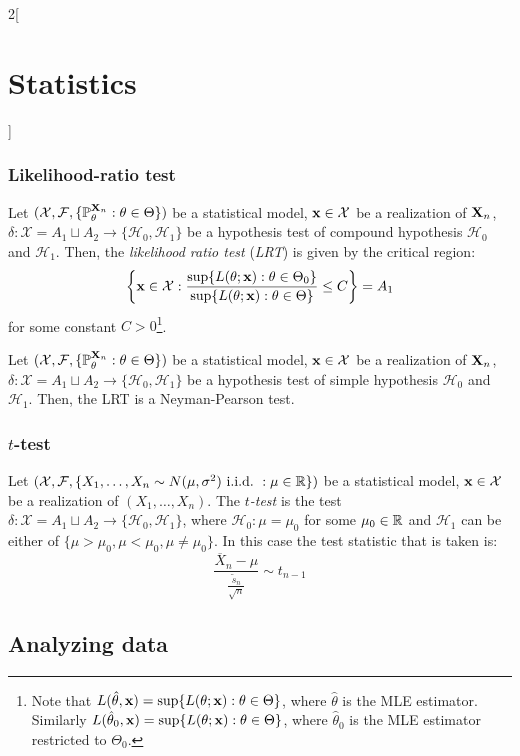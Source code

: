 \documentclass[../../../main.tex]{subfiles}
\begin{document}
\begin{multicols}{2}[\section{Statistics}]
  \subsubsection{Likelihood-ratio test}
  \begin{definition}
    Let $(\mathcal{X},\mathcal{F},\{\mathbb{P}_\theta^{\boldsymbol{\mathrm{X}}_n}:\theta\in\Theta\})$ be a statistical model, $\boldsymbol{\mathrm{x}}\in\mathcal{X}$ be a realization of $\boldsymbol{\mathrm{X}}_n$, $\delta:\mathcal{X}=A_1\sqcup A_2\rightarrow\{\mathcal{H}_0,\mathcal{H}_1\}$ be a hypothesis test of compound hypothesis $\mathcal{H}_0$ and $\mathcal{H}_1$.
    Then, the \emph{likelihood ratio test} (\emph{LRT}) is given by the critical region:
    $$\left\{\boldsymbol{\mathrm{x}}\in\mathcal{X}:\frac{\sup\{L(\theta;\boldsymbol{\mathrm{x}}):\theta\in\Theta_0\}}{\sup\{L(\theta;\boldsymbol{\mathrm{x}}):\theta\in\Theta\}}\leq C\right\}= A_1$$
    for some constant $C>0$\footnote{Note that $L(\hat\theta,\boldsymbol{\mathrm{x}})=\sup\{L(\theta;\boldsymbol{\mathrm{x}}):\theta\in\Theta\}$, where $\hat\theta$ is the MLE estimator. Similarly $L(\hat\theta_0,\boldsymbol{\mathrm{x}})=\sup\{L(\theta;\boldsymbol{\mathrm{x}}):\theta\in\Theta\}$, where $\hat\theta_0$ is the MLE estimator restricted to $\Theta_0$.}.
  \end{definition}
  \begin{proposition}
    Let $(\mathcal{X},\mathcal{F},\{\mathbb{P}_\theta^{\boldsymbol{\mathrm{X}}_n}:\theta\in\Theta\})$ be a statistical model, $\boldsymbol{\mathrm{x}}\in\mathcal{X}$ be a realization of $\boldsymbol{\mathrm{X}}_n$, $\delta:\mathcal{X}=A_1\sqcup A_2\rightarrow\{\mathcal{H}_0,\mathcal{H}_1\}$ be a hypothesis test of simple hypothesis $\mathcal{H}_0$ and $\mathcal{H}_1$. Then, the LRT is a Neyman-Pearson test.
  \end{proposition}
  \subsubsection{\texorpdfstring{$t$}{t}-test}
  \begin{definition}[$t$-test]
    Let $(\mathcal{X},\mathcal{F},\{X_1,\ldots,X_n\sim N(\mu,\sigma^2)\ \text{i.i.d.\ } : \mu\in\mathbb{R}\})$ be a statistical model, $\boldsymbol{\mathrm{x}}\in\mathcal{X}$ be a realization of $(X_1,\ldots,X_n)$. The \emph{$t$-test} is the test $\delta:\mathcal{X}=A_1\sqcup A_2\rightarrow\{\mathcal{H}_0,\mathcal{H}_1\}$, where $\mathcal{H}_0:\mu=\mu_0$ for some $\mu_0\in\mathbb{R}$ and $\mathcal{H}_1$ can be either of $\{\mu>\mu_0,\mu<\mu_0,\mu\ne\mu_0\}$. In this case the test statistic that is taken is: $$\frac{\overline{X}_n-\mu}{\frac{\tilde{s}_n}{\sqrt{n}}}\sim t_{n-1}$$
  \end{definition}
  \subsection{Analyzing data}

\end{multicols}
\end{document}
